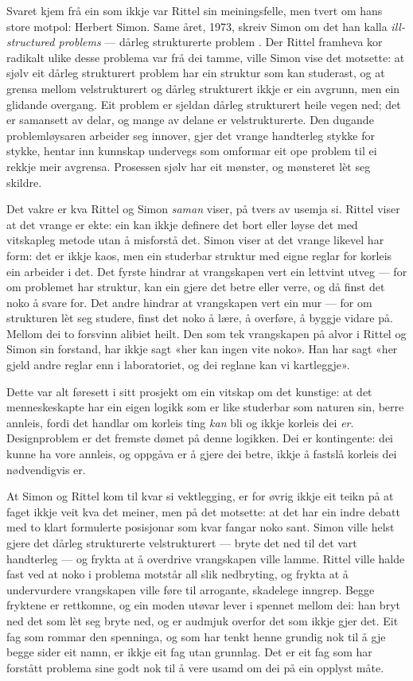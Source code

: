 Svaret kjem frå ein som ikkje var Rittel sin meiningsfelle, men tvert om hans store motpol: Herbert Simon. Same året, 1973, skreiv Simon om det han kalla \emph{ill-structured problems} — dårleg strukturerte problem \autocite{simon1973illstructured}. Der Rittel framheva kor radikalt ulike desse problema var frå dei tamme, ville Simon vise det motsette: at sjølv eit dårleg strukturert problem har ein struktur som kan studerast, og at grensa mellom velstrukturert og dårleg strukturert ikkje er ein avgrunn, men ein glidande overgang. Eit problem er sjeldan dårleg strukturert heile vegen ned; det er samansett av delar, og mange av delane er velstrukturerte. Den dugande problemløysaren arbeider seg innover, gjer det vrange handterleg stykke for stykke, hentar inn kunnskap undervegs som omformar eit ope problem til ei rekkje meir avgrensa. Prosessen sjølv har eit mønster, og mønsteret lèt seg skildre.

Det vakre er kva Rittel og Simon \emph{saman} viser, på tvers av usemja si. Rittel viser at det vrange er ekte: ein kan ikkje definere det bort eller løyse det med vitskapleg metode utan å misforstå det. Simon viser at det vrange likevel har form: det er ikkje kaos, men ein studerbar struktur med eigne reglar for korleis ein arbeider i det. Det fyrste hindrar at vrangskapen vert ein lettvint utveg — for om problemet har struktur, kan ein gjere det betre eller verre, og då finst det noko å svare for. Det andre hindrar at vrangskapen vert ein mur — for om strukturen lèt seg studere, finst det noko å lære, å overføre, å byggje vidare på. Mellom dei to forsvinn alibiet heilt. Den som tek vrangskapen på alvor i Rittel og Simon sin forstand, har ikkje sagt «her kan ingen vite noko». Han har sagt «her gjeld andre reglar enn i laboratoriet, og dei reglane kan vi kartleggje».

Dette var alt føresett i \textcite{simon1969sciences} sitt prosjekt om ein vitskap om det kunstige: at det menneskeskapte har ein eigen logikk som er like studerbar som naturen sin, berre annleis, fordi det handlar om korleis ting \emph{kan} bli og ikkje korleis dei \emph{er}. Designproblem er det fremste dømet på denne logikken. Dei er kontingente: dei kunne ha vore annleis, og oppgåva er å gjere dei betre, ikkje å fastslå korleis dei nødvendigvis er.

At Simon og Rittel kom til kvar si vektlegging, er for øvrig ikkje eit teikn på at faget ikkje veit kva det meiner, men på det motsette: at det har ein indre debatt med to klart formulerte posisjonar som kvar fangar noko sant. Simon ville helst gjere det dårleg strukturerte velstrukturert — bryte det ned til det vart handterleg — og frykta at å overdrive vrangskapen ville lamme. Rittel ville halde fast ved at noko i problema motstår all slik nedbryting, og frykta at å undervurdere vrangskapen ville føre til arrogante, skadelege inngrep. Begge fryktene er rettkomne, og ein moden utøvar lever i spennet mellom dei: han bryt ned det som lèt seg bryte ned, og er audmjuk overfor det som ikkje gjer det. Eit fag som rommar den spenninga, og som har tenkt henne grundig nok til å gje begge sider eit namn, er ikkje eit fag utan grunnlag. Det er eit fag som har forstått problema sine godt nok til å vere usamd om dei på ein opplyst måte.

